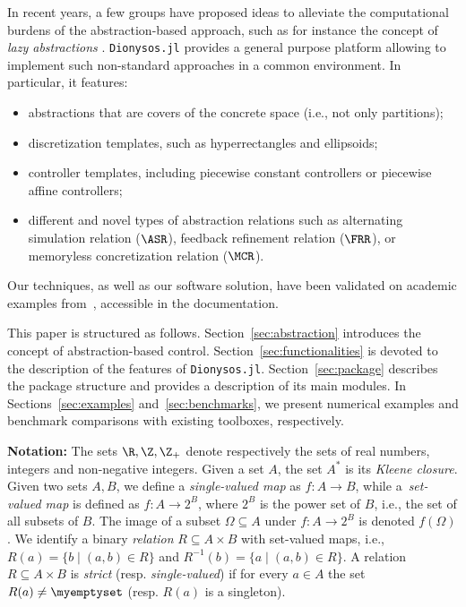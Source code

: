 \documentclass{juliacon}
\begin{document}
\vskip 6pt
In recent years, a few groups have proposed ideas to alleviate the computational burdens of the abstraction-based approach, such as for instance the concept of \emph{lazy abstractions} \cite{camara2011safety,girard2015safety,tazaki2009discrete,hsu2018multi}.
\texttt{Dionysos.jl} provides a general purpose platform allowing to implement such non-standard approaches in a common environment. In particular, it features:
\begin{itemize}
    \item abstractions that are covers of the concrete space (i.e., not only partitions);
    \item discretization templates, such as hyperrectangles and ellipsoids;
    \item controller templates, including piecewise constant controllers or piecewise affine controllers;
    \item different and novel types of abstraction relations such as alternating simulation relation ($\ASR$), feedback refinement relation ($\FRR$), or memoryless concretization relation ($\MCR$).
\end{itemize}


\vskip 6pt
%
Our techniques, as well as our software solution, have been validated on academic examples from~\cite{girard2009approximately,mouelhi2013cosyma,reissig2016feedback,gol2014language}, accessible in the documentation.

\vskip 6pt
This paper is structured as follows.  Section~\ref{sec:abstraction} introduces the concept of abstraction-based control. Section~\ref{sec:functionalities} is devoted to the description of the features of \texttt{Dionysos.jl}. Section~\ref{sec:package} describes the package structure and provides a description of its main modules. In Sections~\ref{sec:examples} and~\ref{sec:benchmarks}, we present numerical examples and benchmark comparisons with existing toolboxes, respectively.

\vskip 6pt
\noindent \textbf{Notation:} 
The sets $\R,\Z, \Z_+$ denote respectively the sets of real numbers, integers and non-negative integers.
\color{red}Given a set $A$, the set $A^*$ is its \emph{Kleene closure}. \color{black}
Given two sets $A,B$, we define a \emph{single-valued map} as $f:A\rightarrow B$, while a~\emph{set-valued map} is defined as $f:A\rightarrow 2^B$, where $2^B$ is the power set of $B$, i.e., the set of all subsets of $B$. 
The image of a subset $\Omega\subseteq A$ under $f:A\rightarrow 2^B$ is denoted $f(\Omega)$.
We identify a binary \emph{relation} $R\subseteq A \times B$ with set-valued maps, i.e., $R(a) = \{b \mid (a, b)\in R\}$ and $R^{-1}(b) =\{ a \mid (a, b)\in R\}$.
%
A relation $R\subseteq A\times B$ is \emph{strict} (resp. \emph{single-valued}) if for every $a\in A$ the set $R(a)\ne \myemptyset$ (resp. $R(a)$ is a singleton). 
\end{document}
